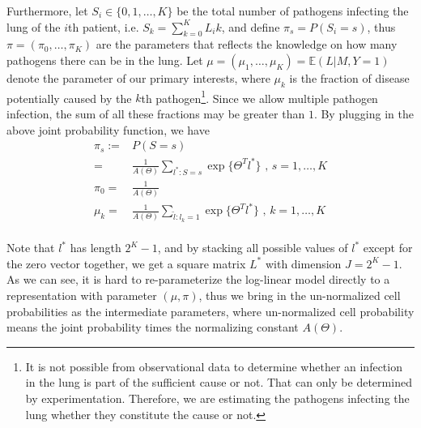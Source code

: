 \documentclass[11 pt, a4paper]{article}  %
\begin{document}
Furthermore, let $S_i \in \{0,1,\ldots, K\}$ be the total number of pathogens infecting the lung of the $i$th patient, i.e. $S_k=\sum_{k=0}^K L_ik$, and define $\pi_s=P(S_i=s)$, thus $\pi=(\pi_0,\ldots,\pi_K)$ are the parameters that reflects the knowledge on how many pathogens there can be in the lung. Let $\mu = (\mu_1, \ldots,\mu_K) = \mathbb{E}(L|M,Y=1)$ denote the parameter of our primary interests, where $\mu_k$ is the fraction of disease potentially caused by the $k$th pathogen\footnote{ It is not possible from observational data to determine whether an infection in the lung is part of the sufficient cause or not. That can only be determined by experimentation. Therefore, we are estimating the pathogens infecting the lung whether they constitute the cause or not.}. Since we allow multiple pathogen infection, the sum of all these fractions may be greater than $1$. By plugging in the above joint probability function, we have
\begin{align}
\pi_s := & P(S=s)\nonumber \\ 
= & \frac{1}{A(\Theta)} \sum_{l^*:S=s}\exp \{ \Theta^T l^*\}  \text{ , } s = 1,\ldots, K \\
\pi_0 = & \frac{1}{A(\Theta)} \nonumber \\
\mu_k = & \frac{1}{A(\Theta)} \sum_{\tilde{l}:l_k=1}\exp \{ \Theta^T l^*\}  \text{ , } k = 1, \ldots, K
\end{align}
\\
Note that $l^*$ has length $2^K-1$, and by stacking all possible values of $l^*$ except for the zero vector together, we get a square matrix $L^*$ with dimension $J = 2^K-1$.
As we can see, it is hard to re-parameterize the log-linear model directly to a representation with parameter $(\mu, \pi)$, thus we bring in the un-normalized cell probabilities as the intermediate parameters, where un-normalized cell probability means the joint probability times the normalizing constant $A(\Theta)$.\\
\end{document}
